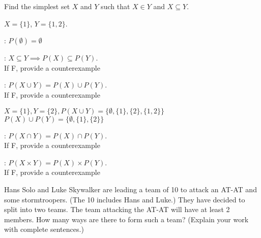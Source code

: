 \nextq
Find the simplest set $X$ and $Y$ such that $X \in Y$
and $X \subseteq Y$.
\begin{answerlong}
$X = \{ 1 \}$, $Y = \{ 1,2 \}$.
\end{answerlong}

\nextq
\tf: $P(\emptyset) = \emptyset$
\dotfill{}

\nextq
\tf: $X \subseteq Y \implies P(X) \subseteq P(Y)$.
\dotfill{}
\\
If F, provide a counterexample
\begin{answerlong}

\end{answerlong}

\nextq
\tf: $P(X \cup Y) = P(X) \cup P(Y)$.
\dotfill{}
\\
If F, provide a counterexample
\begin{answerlong}
$X = \{1\}, Y = \{2\}, P(X \cup Y) = \{\emptyset, \{1\}, \{2\}, \{1,2\} \}$
$P(X) \cup P(Y) = \{\emptyset, \{1\}, \{2\}\}$
\end{answerlong}

\nextq
\tf: $P(X \cap Y) = P(X) \cap P(Y)$.
\dotfill{}
\\
If F, provide a counterexample
\begin{answerlong}

\end{answerlong}

\nextq
\tf: $P(X \times Y) = P(X) \times P(Y)$.
\dotfill\answerbox{}
\\
If F, provide a counterexample
\begin{answerlong}

\end{answerlong}

\nextq
Hans Solo and Luke Skywalker are leading a team of 10 to attack
an AT-AT and some stormtroopers. (The 10 includes Hans and Luke.)
They have decided to split into two teams.
The team attacking the AT-AT will have at least 2 members.
How many ways are there to form such a team?
(Explain your work with complete sentences.)
\begin{answerlong}

\end{answerlong}

